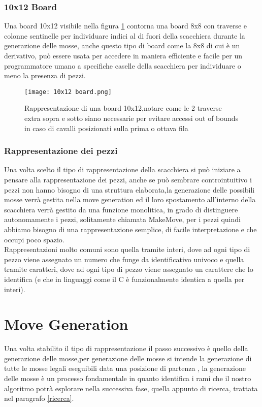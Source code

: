 \subsubsection{10x12 Board}
Una board 10x12 visibile nella figura \ref{10x12} contorna una board 8x8 con traverse e colonne sentinelle per individuare indici al di fuori della scacchiera durante la generazione delle mosse, anche questo tipo di board 
come la 8x8 di cui è un derivativo, può essere usata per accedere in maniera efficiente e facile per un programmatore umano a specifiche caselle della scacchiera per individuare o meno la presenza di pezzi.
\vfill
\begin{figure}[!ht]
    \centering
    \texttt{[image: 10x12 board.png]}
    \caption{Rappresentazione di una board 10x12,notare come le 2 traverse extra sopra e sotto siano necessarie per evitare accessi out of bounds in caso di cavalli posizionati sulla prima o ottava fila }
    \label{10x12}
\end{figure}



\subsubsection{Rappresentazione dei pezzi}
Una volta scelto il tipo di rappresentazione della scacchiera si può iniziare a pensare alla rappresentazione dei pezzi,
anche se può sembrare controintuitivo i pezzi non hanno bisogno di una struttura elaborata,la generazione delle possibili
mosse verrà gestita nella move generation ed il loro spostamento all'interno della scacchiera verrà gestito da una funzione monolitica, in grado di distinguere autonomamente i pezzi, solitamente chiamata
MakeMove, per i pezzi quindi abbiamo bisogno di una
rappresentazione semplice, di facile interpretazione e che occupi poco spazio.\\Rappresentazioni molto comuni sono quella
tramite interi, dove ad ogni tipo di pezzo viene assegnato un numero che funge da identificativo univoco e quella tramite
caratteri, dove ad ogni tipo di pezzo viene assegnato un carattere che lo identifica (e che in linguaggi come il C è funzionalmente identica a quella per interi).


\section{Move Generation}
\label{move generation} %
%
Una volta stabilito il tipo di rappresentazione il passo successivo è quello della generazione delle mosse,per generazione delle mosse si intende la generazione
di tutte le mosse legali eseguibili data una posizione di partenza , la generazione delle mosse è un processo fondamentale in quanto identifica i rami che
il nostro algoritmo potrà esplorare nella successiva fase, quella appunto di ricerca, trattata nel paragrafo \ref{ricerca}.



